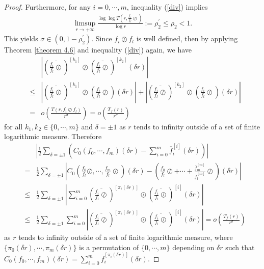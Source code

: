 \documentclass{article}
\begin{document}
\begin{proof}
    Furthermore, for any $i=0, \cdots, m$, inequality (\ref{div}) implies
    \begin{eqnarray*}
        \limsup\limits_{r\rightarrow +\infty}\frac{\log\log T\left(r,\frac{f_{i}}{f_{l}}\oslash\right)}{\log r}:=\rho_{2}^{'}\leq \rho_{2}<1.
    \end{eqnarray*}
    This yields $\sigma\in(0, 1-\rho_{2}^{'})$. Since $f_{i}\oslash f_{l}$ is well defined, then by applying Theorem \ref{theorem 4.6} and inequality (\ref{div}) again, we have
    \begin{eqnarray*}
        &&\left|\left(\overline{\frac{f_{i}}{f_{l}}\oslash}\right)^{[k_{1}]}\oslash \left(\overline{\frac{f_{i}}{f_{l}}\oslash}\right)^{[k_{2}]}(\delta r)\right|\\&\leq&\left|\left(\overline{\frac{f_{i}}{f_{l}}\oslash}\right)^{[k_{1}]}\oslash \left(\frac{f_{i}}{f_{l}}\oslash\right)(\delta r)\right|+\left|\left(\overline{\frac{f_{i}}{f_{l}}\oslash}\right)^{[k_{2}]}\oslash \left(\frac{f_{i}}{f_{l}}\oslash\right)(\delta r)\right|\\
        &=& o\left(\frac{T(r, f_{i}\oslash f_{l})}{r^{\sigma}}\right)=o\left(\frac{T_{f}(r)}{r^{\sigma}}\right)
    \end{eqnarray*}
    for all $k_{1}, k_{2}\in\{0, \cdots, m\}$ and $\delta=\pm 1$ as $r$ tends to infinity outside of a set of finite logarithmic measure. Therefore
    \begin{eqnarray}\label{equa2}
        &&\left|\frac{1}{2}\sum_{\delta=\pm 1}\left(C_{0}(f_{0}, \cdots, f_{m})(\delta r)-\sum_{i=0}^{m}\overline{f}_{i}^{[i]}(\delta r)\right)\right|\nonumber\\
        &=&\frac{1}{2}\sum_{\delta=\pm 1}\left|C_{0}\left(\frac{f_{0}}{f_{l}}\oslash, \cdots ,\frac{f_{m}}{f_{l}}\oslash\right)(\delta r)-\left(\frac{f_{0}}{f_{l}}\oslash+\cdots+\frac{\overline{f}_{m}^{[m]}}{\overline{f}_{l}^{[m]}}\oslash\right) (\delta r)\right|\nonumber\\
        &\leq&\frac{1}{2}\sum_{\delta=\pm 1}\left|\sum_{i=0}^{m}\left(\overline{\frac{f_{i}}{f_{l}}\oslash}\right)^{[\pi_{i}(\delta r)]}\oslash \left(\overline{\frac{f_{i}}{f_{l}}\oslash}\right)^{[i]}
   (\delta r)\right|\nonumber\\
        &\leq&\frac{1}{2}\sum_{\delta=\pm 1}\sum_{i=0}^{m}\left|\left(\overline{\frac{f_{i}}{f_{l}}\oslash}\right)^{[\pi_{i}(\delta r)]}\oslash \left(\overline{\frac{f_{i}}{f_{l}}\oslash}\right)^{[i]}(\delta r)\right|=o\left(\frac{T_{f}(r)}{r^{\sigma}}\right)
    \end{eqnarray}
    as $r$ tends to infinity outside of a set of finite logarithmic measure, where $\{\pi_{0}(\delta r), \cdots, \pi_{m}(\delta r)\}$ is a permutation of $\{0, \cdots, m\}$ depending on $\delta r$ such that $C_{0}(f_{0}, \cdots, f_{m})(\delta r)=\sum_{i=0}^{m}\overline{f}_{i}^{[\pi_{i}(\delta r)]}(\delta r)$.


\end{proof}
\end{document}
